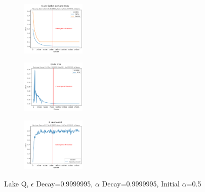 \documentclass[letterpaper]{article} %
\begin{document}
\begin{figure}[!htb]
	\centering
 	\begin{subfigure}[b]{0.175\textwidth}
		\includegraphics[width=1.2in]{Figures/Q_Lake_Epsilon_and_Alpha_Decay_Map_Large__Gamma_0_9__E_Dec_0_9999995__Alpha_0_5__A_Dec_0_9999995__Is_Slippery.png}
  	\end{subfigure}%
	 \begin{subfigure}[b]{0.175\textwidth}
		\includegraphics[width=1.2in]{Figures/Q_Lake_Error_Map_Large__Gamma_0_9__E_Dec_0_9999995__Alpha_0_5__A_Dec_0_9999995__Is_Slippery.png}
  	\end{subfigure}%
	\begin{subfigure}[b]{0.175\textwidth}
		\includegraphics[width=1.2in]{Figures/Q_Lake_Reward_Map_Large__Gamma_0_9__E_Dec_0_9999995__Alpha_0_5__A_Dec_0_9999995__Is_Slippery.png}
  	\end{subfigure}
\caption{Lake Q,  $\epsilon$ Decay=0.9999995, $\alpha$ Decay=0.9999995, Initial $\alpha$=0.5}
\label{fig:lake_q_e_9999995_a_9999995_rewards}
\end{figure}
\end{document}
